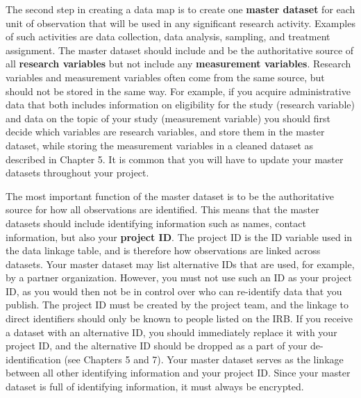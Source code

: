 The second step in creating a data map is to create one \textbf{master dataset}
for each unit of observation
that will be used in any significant research activity.
Examples of such activities are data collection, data analysis,
sampling, and treatment assignment.
The master dataset should include and be the authoritative source of
all \textbf{research variables}
but not include any \textbf{measurement variables}.
Research variables and measurement variables
often come from the same source,
but should not be stored in the same way.
For example, if you acquire administrative data that both includes
information on eligibility for the study (research variable)
and data on the topic of your study (measurement variable)
you should first decide which variables are research variables,
and store them in the master dataset,
while storing the measurement variables in a cleaned dataset
as described in Chapter 5.
It is common that you will have to update
your master datasets throughout your project.

The most important function of the master dataset
is to be the authoritative source 
for how all observations are identified.
This means that the master datasets should include
identifying information such as names, contact information,
but also your \textbf{project ID}.
The project ID is the ID variable used in the data linkage table,
and is therefore how observations are linked across datasets.
Your master dataset may list alternative IDs that are used,
for example, by a partner organization.
However, you must not use such an ID as your project ID,
as you would then not be in control over 
who can re-identify data that you publish.
The project ID must be created by the project team, 
and the linkage to direct identifiers 
should only be known to people listed on the IRB.
If you receive a dataset with an alternative ID,
you should immediately replace it with your project ID,
and the alternative ID should be dropped 
as a part of your de-identification (see Chapters 5 and 7).
Your master dataset serves as the linkage between
all other identifying information and your project ID.
Since your master dataset is full of identifying information,
it must always be encrypted.

